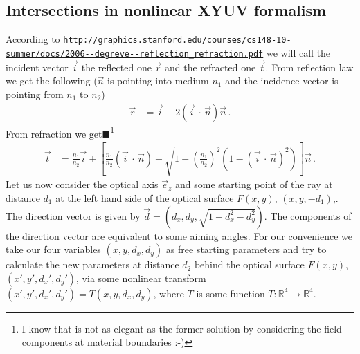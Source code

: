 \documentclass[12pt,a4paper,twoside,openright,BCOR10mm,headsepline,titlepage,abstracton,chapterprefix,final]{scrreprt}
\newcommand{\scpm}[2]{(#1\,\cdot\,#2)}
\newcommand{\remark}[1]{{\color{red}$\blacksquare$}\footnote{{\color{red}#1}}}
\begin{document}
\subsection{Intersections in nonlinear XYUV formalism}
According to {{\tt \url{http://graphics.stanford.edu/courses/cs148-10-summer/docs/2006--degreve--reflection_refraction.pdf}}}
we will call the incident vector $\vec{i}$ the reflected one $\vec{r}$ and the refracted one $\vec{t}$.
From reflection law we get the following ($\vec{n}$ is pointing into medium $n_1$ and the incidence vector is pointing from $n_1$ to $n_2$)
\begin{align}
 \vec{r} &= \vec{i} - 2 \scpm{\vec{i}}{\vec{n}} \vec{n}\,.\label{eq:reflection_vector}
\end{align}
From refraction we get\remark{I know that is not as elegant as the former 
solution by considering the field components at material boundaries :-)}
\begin{align}
 \vec{t} &= \frac{n_1}{n_2} \vec{i} 
 + \left[\frac{n_1}{n_2} \scpm{\vec{i}}{\vec{n}} 
      - \sqrt{1 - \left(\frac{n_1}{n_2}\right)^2 (1 - {\scpm{\vec{i}}{\vec{n}}}^2)}\right] \vec{n}\,.\label{eq:refraction_vector}
\end{align}
Let us now consider the optical axis $\vec{e}_z$ and some starting point of the ray at distance $d_1$ at the left hand side
of the optical surface $F(x, y)$, $(x,y,-d_1)$,. The direction vector is given by $\vec{d} = (d_x, d_y, \sqrt{1 - d_x^2 - d_y^2})$.
The components of the direction vector are equivalent to some aiming angles. For our convenience we take our
four variables $(x, y, d_x, d_y)$ as free starting parameters and try to calculate the new parameters at distance $d_2$ behind the
optical surface $F(x, y)$, $(x', y', {d_x}', {d_y}')$, via some nonlinear transform $(x', y', {d_x}', {d_y}') = T(x, y, d_x, d_y)$,
where $T$ is some function $T:\mathbb{R}^4 \to \mathbb{R}^4$.
\end{document}
